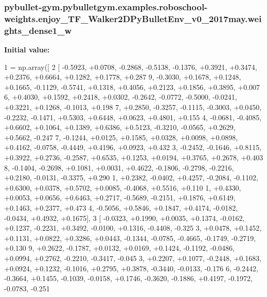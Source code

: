 \subsubsection[{\texorpdfstring{weights\+\_\+dense1\+\_\+w}{weights_dense1_w}}]{\setlength{\rightskip}{0pt plus 5cm}pybullet-\/gym.\+pybulletgym.\+examples.\+roboschool-\/weights.\+enjoy\+\_\+\+T\+F\+\_\+\+Walker2\+D\+Py\+Bullet\+Env\+\_\+v0\+\_\+2017may.\+weights\+\_\+dense1\+\_\+w}\hypertarget{namespacepybullet-gym_1_1pybulletgym_1_1examples_1_1roboschool-weights_1_1enjoy___t_f___walker2_d_py_bullet_env__v0__2017may_a56a6607c9790036edc4bf6d3863c2bcc}{}\label{namespacepybullet-gym_1_1pybulletgym_1_1examples_1_1roboschool-weights_1_1enjoy___t_f___walker2_d_py_bullet_env__v0__2017may_a56a6607c9790036edc4bf6d3863c2bcc}
{\bfseries Initial value\+:}
\begin{DoxyCode}
1 = np.array([
2 [ -0.5923, +0.0708, -0.2868, -0.5138, -0.1376, +0.3921, +0.3474, +0.2376, +0.6664, +0.1282, +0.1778, +0.287
      9, -0.3030, +0.1678, +0.1248, +0.1665, -0.1129, -0.5741, +0.1318, +0.4056, +0.2123, +0.1856, +0.3895, +0.007
      6, +0.4030, +0.1592, +0.2418, +0.0302, -0.2642, -0.0772, -0.5000, -0.0241, +0.3221, +0.1268, -0.1013, +0.198
      7, +0.2850, -0.3257, -0.1115, -0.3003, +0.0450, -0.2232, -0.1471, +0.5303, +0.6448, +0.0623, +0.4801, +0.155
      4, -0.0681, -0.4085, +0.6602, +0.1064, +0.1389, +0.6386, +0.5123, -0.3210, -0.0565, +0.2629, +0.5662, -0.247
      7, -0.1244, +0.0125, +0.1585, +0.0328, +0.0098, +0.0898, +0.4162, -0.0758, -0.4449, +0.4196, +0.0923, +0.432
      3, -0.2452, -0.1646, +0.8115, +0.3922, +0.2736, -0.2587, +0.6535, +0.1253, +0.0194, +0.3765, +0.2678, +0.403
      8, -0.1404, -0.2698, +0.1081, +0.0031, +0.4622, -0.1806, -0.2798, -0.2216, +0.2180, -0.0131, -0.3375, +0.290
      1, +0.2382, -0.0402, +0.4257, -0.2084, -0.1102, +0.6300, +0.0378, +0.5702, +0.0085, -0.4068, +0.5516, +0.110
      1, +0.4330, +0.0053, +0.0656, +0.6463, +0.2717, -0.5689, -0.2151, +0.1876, +0.6149, +0.1463, +0.2377, +0.473
      4, -0.5056, +0.5846, +0.1847, +0.4174, -0.0182, -0.0434, +0.4932, +0.1675],
3 [ -0.0323, +0.1990, +0.0035, +0.1374, -0.0162, +0.1237, -0.2231, +0.3492, -0.0100, +0.1316, -0.4408, -0.325
      3, +0.0478, +0.1452, +0.1131, +0.0822, +0.3286, +0.0443, -0.1344, -0.0785, -0.4665, -0.1749, -0.2719, +0.130
      9, +0.2622, -0.1787, +0.0132, +0.0169, +0.1424, -0.1192, -0.0486, +0.0994, +0.2762, -0.2210, -0.3417, -0.045
      3, +0.2207, +0.1077, -0.2448, +0.1683, +0.0924, +0.1232, -0.1016, +0.2795, +0.3878, -0.3440, -0.0133, -0.176
      6, -0.2442, -0.3664, +0.1455, -0.1039, -0.0158, +0.1746, -0.3620, -0.1886, +0.4197, -0.1972, -0.0783, -0.251

\end{DoxyCode}
